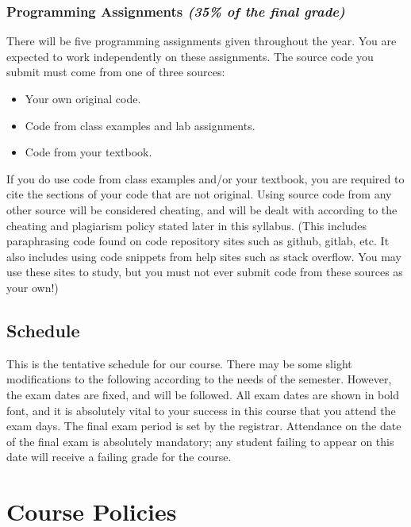 \documentclass[11pt]{article}
\begin{document}
\subsubsection*{Programming Assignments {\em (35\% of the final grade)}}
There will be five programming assignments given throughout the year.
You are expected to work independently on these assignments.  The
source code you submit must come from one of three sources:
\begin{itemize}
    \item Your own original code.
    \item Code from class examples and lab assignments.
    \item Code from your textbook.
\end{itemize}

If you do use code from class examples and/or your textbook, you are
required to cite the sections of your code that are not original.
Using source code from any other source will be considered cheating,
and will be dealt with according to the cheating and plagiarism policy
stated later in this syllabus.
(This includes paraphrasing code found on code repository sites such
as github, gitlab, etc.  It also includes using code snippets from
help sites such as stack overflow.  You may use these sites to study,
but you must not ever submit code from these sources as your own!)



\subsection*{Schedule}
This is the tentative schedule for our course.  There may be some
slight modifications to the following according to the needs of the
semester. However, the exam dates are fixed, and will be followed.
All exam dates are shown in bold font, and it is absolutely vital to
your success in this course that you attend the exam days.  The final
exam period is set by the registrar.  Attendance on the date of the
final exam is absolutely mandatory; any student failing to appear on
this date will receive a failing grade for the course.




\newpage
\section*{Course Policies}
\end{document}
